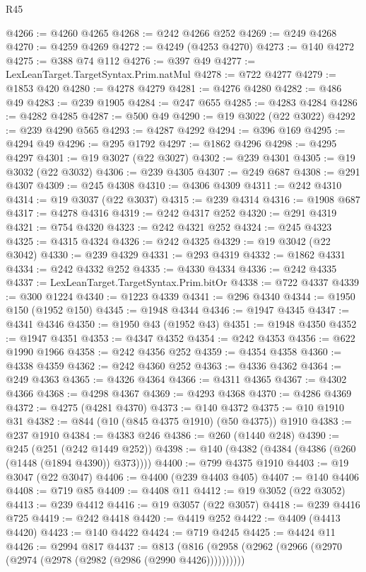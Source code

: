 \begin{lexlean}{R45}
\begin{coremodule}
{@4266 := @4260 @4265
@4268 := @242 @4266 @252
@4269 := @249 @4268
@4270 := @4259 @4269
@4272 := @4249 (@4253 @4270)
@4273 := @140 @4272
@4275 := @388 @74 @112
@4276 := @397 @49
@4277 := LexLeanTarget.TargetSyntax.Prim.natMul
@4278 := @722 @4277
@4279 := @1853 @420
@4280 := @4278 @4279
@4281 := @4276 @4280
@4282 := @486 @49
@4283 := @239 @1905
@4284 := @247 @655
@4285 := @4283 @4284
@4286 := @4282 @4285
@4287 := @500 @49
@4290 := @19 @3022 (@22 @3022)
@4292 := @239 @4290 @565
@4293 := @4287 @4292
@4294 := @396 @169
@4295 := @4294 @49
@4296 := @295 @1792
@4297 := @1862 @4296
@4298 := @4295 @4297
@4301 := @19 @3027 (@22 @3027)
@4302 := @239 @4301
@4305 := @19 @3032 (@22 @3032)
@4306 := @239 @4305
@4307 := @249 @687
@4308 := @291 @4307
@4309 := @245 @4308
@4310 := @4306 @4309
@4311 := @242 @4310
@4314 := @19 @3037 (@22 @3037)
@4315 := @239 @4314
@4316 := @1908 @687
@4317 := @4278 @4316
@4319 := @242 @4317 @252
@4320 := @291 @4319
@4321 := @754 @4320
@4323 := @242 @4321 @252
@4324 := @245 @4323
@4325 := @4315 @4324
@4326 := @242 @4325
@4329 := @19 @3042 (@22 @3042)
@4330 := @239 @4329
@4331 := @293 @4319
@4332 := @1862 @4331
@4334 := @242 @4332 @252
@4335 := @4330 @4334
@4336 := @242 @4335
@4337 := LexLeanTarget.TargetSyntax.Prim.bitOr
@4338 := @722 @4337
@4339 := @300 @1224
@4340 := @1223 @4339
@4341 := @296 @4340
@4344 := @1950 @150 (@1952 @150)
@4345 := @1948 @4344
@4346 := @1947 @4345
@4347 := @4341 @4346
@4350 := @1950 @43 (@1952 @43)
@4351 := @1948 @4350
@4352 := @1947 @4351
@4353 := @4347 @4352
@4354 := @242 @4353
@4356 := @622 @1990 @1966
@4358 := @242 @4356 @252
@4359 := @4354 @4358
@4360 := @4338 @4359
@4362 := @242 @4360 @252
@4363 := @4336 @4362
@4364 := @249 @4363
@4365 := @4326 @4364
@4366 := @4311 @4365
@4367 := @4302 @4366
@4368 := @4298 @4367
@4369 := @4293 @4368
@4370 := @4286 @4369
@4372 := @4275 (@4281 @4370)
@4373 := @140 @4372
@4375 := @10 @1910 @31
@4382 := @844 (@10 (@845 @4375 @1910) (@50 @4375)) @1910
@4383 := @237 @1910
@4384 := @4383 @246
@4386 := @260 (@1440 @248)
@4390 := @245 (@251 (@242 @1449 @252))
@4398 := @140 (@4382 (@4384 (@4386 (@260 (@1448 (@1894 @4390)) @373))))
@4400 := @799 @4375 @1910
@4403 := @19 @3047 (@22 @3047)
@4406 := @4400 (@239 @4403 @405)
@4407 := @140 @4406
@4408 := @719 @85
@4409 := @4408 @11
@4412 := @19 @3052 (@22 @3052)
@4413 := @239 @4412
@4416 := @19 @3057 (@22 @3057)
@4418 := @239 @4416 @725
@4419 := @242 @4418
@4420 := @4419 @252
@4422 := @4409 (@4413 @4420)
@4423 := @140 @4422
@4424 := @719 @4245
@4425 := @4424 @11
@4426 := @2994 @817
@4437 := @813 (@816 (@2958 (@2962 (@2966 (@2970 (@2974 (@2978 (@2982 (@2986 (@2990 @4426))))))))))
}
\end{coremodule}
\end{lexlean}
